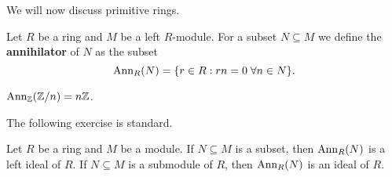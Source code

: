 %
%
%
%

We will now discuss primitive rings. 

Let $R$ be a ring and $M$ be a left $R$-module. For a 
subset $N\subseteq M$
we define the \textbf{annihilator} of $N$ as the subset 
\[
\operatorname{Ann}_R(N)=\{r\in R:rn=0\;\forall n\in N\}.
\]

\begin{example}
	$\operatorname{Ann}_{\mathbb{Z}}(\mathbb{Z}/n)=n\mathbb{Z}$.
\end{example}

The following exercise is standard. 

\begin{exercise}
    Let $R$ be a ring and $M$ be a module. If $N\subseteq M$ is a subset, then 
	$\operatorname{Ann}_R(N)$ is a left ideal of $R$. If $N\subseteq M$ is a submodule of $R$, then 
	$\operatorname{Ann}_R(N)$ is an ideal of $R$. 
\end{exercise}


	
